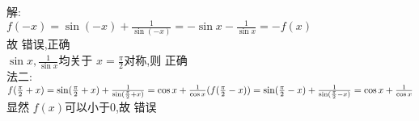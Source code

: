 \documentclass[class=ctexart,crop=false]{standalone}
\begin{document}
解:\\
$f(-x)=\sin (-x)+\frac{1}{\sin (-x)}=-\sin x-\frac{1}{\sin x}=-f(x)$\\
故  错误,正确\\
$\sin x ,\frac{1}{\sin x}$均关于 $x=\frac{\pi}{2}$对称,则  正确\\
法二:$f(\frac{\pi}{2}+x)=\sin (\frac{\pi}{2}+x)+\frac{1}{\sin (\frac{\pi}{2}+x)}=\cos x+\frac{1}{\cos x}\\
  (f(\frac{\pi}{2}-x))=\sin (\frac{\pi}{2}-x)+\frac{1}{\sin(\frac{\pi}{2}-x)}=\cos x+\frac{1}{\cos x}$\\
显然 $f(x)$可以小于0,故 错误\\
\end{document}
